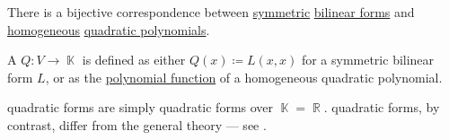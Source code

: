 \begin{proposition}\label{thm:quadratic_forms}
  There is a bijective correspondence between \hyperref[def:symmetric_function]{symmetric} \hyperref[def:bilinear_form]{bilinear forms} and \hyperref[def:homogeneous_polynomial]{homogeneous} \hyperref[def:polynomial_degree]{quadratic polynomials}.

  A  \( Q: V \to \BbbK \) is defined as either \( Q(x) \coloneqq L(x, x) \) for a symmetric bilinear form \( L \), or as the \hyperref[thm:polynomial_algebra_universal_property]{polynomial function} of a homogeneous quadratic polynomial.

   quadratic forms are simply quadratic forms over \( \BbbK = \BbbR \).  quadratic forms, by contrast, differ from the general theory --- see .
\end{proposition}
